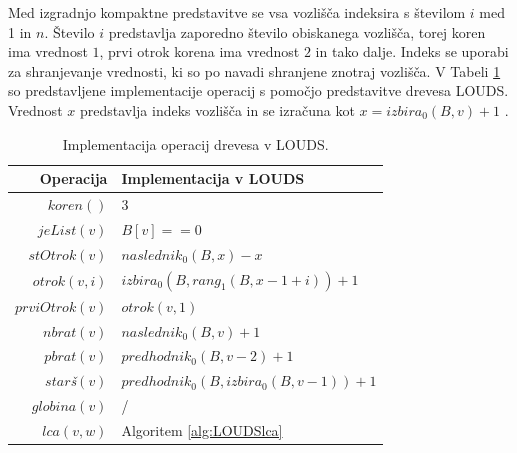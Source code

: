 Med izgradnjo kompaktne predstavitve se vsa vozlišča indeksira s številom $i$  med 1 in $n$. Število $i$ predstavlja zaporedno število obiskanega vozlišča, torej koren ima vrednost $1$, prvi otrok korena ima vrednost $2$ in tako dalje. Indeks se uporabi za shranjevanje vrednosti, ki so po navadi shranjene znotraj vozlišča. V Tabeli \ref{tab:LOUDSop} so predstavljene implementacije operacij s pomočjo predstavitve drevesa LOUDS. Vrednost $x$ predstavlja indeks vozlišča in se izračuna kot $x=izbira_0(B,v)+1$ \cite{Navarro2016}.

\begin{table}[htb]
    \centering
    \caption{Implementacija operacij drevesa v LOUDS.}
    \begin{tabular}{r|l}
\textbf{Operacija}& \textbf{Implementacija v LOUDS} \\\hline
         $koren()$& 3\\
         $jeList(v)$& $B[v]==0$\\
         $stOtrok(v)$& $naslednik_0(B,x)-x$\\
         $otrok(v,i)$& $izbira_0(B, rang_1(B, x - 1 + i))+1$\\
         $prviOtrok(v)$& $otrok(v,1)$\\
         $nbrat(v)$& $naslednik_0(B,v)+1$ \\
         $pbrat(v)$& $predhodnik_0(B,v-2)+1$ \\
         $star$\textit{š}$(v)$& $predhodnik_0(B,izbira_0(B,v-1))+1$ \\
         $globina(v)$& / \\
         $lca(v,w)$&  Algoritem \ref{alg:LOUDSlca}\\

    \end{tabular}
    \label{tab:LOUDSop}
\end{table}



